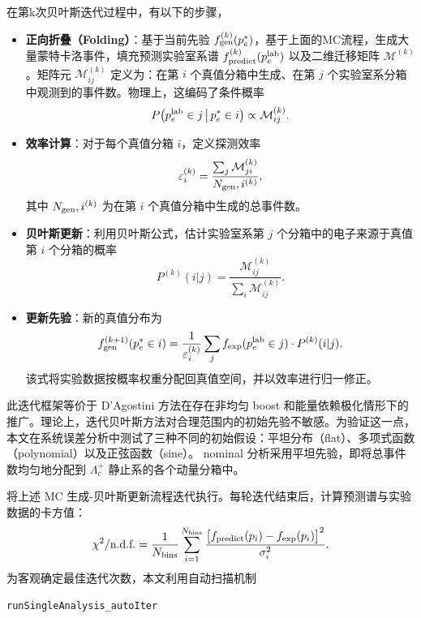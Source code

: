 在第k次贝叶斯迭代过程中，有以下的步骤，
\begin{itemize}
        \item \textbf{正向折叠（Folding）}：基于当前先验 $f_{\rm gen}^{(k)}(p_e^*)$，基于上面的MC流程，生成大量蒙特卡洛事件，填充预测实验室系谱 $f_{\rm predict}^{(k)}(p_e^{\rm lab})$ 以及二维迁移矩阵 $\mathcal{M}^{(k)}$。矩阵元 $\mathcal{M}^{(k)}_{ij}$ 定义为：在第 $i$ 个真值分箱中生成、在第 $j$ 个实验室系分箱中观测到的事件数。物理上，这编码了条件概率
    \begin{equation}\label{eq:migration_prob}
        P\bigl(p_e^{\rm lab} \in j \,\big|\, p_e^* \in i\bigr) \propto \mathcal{M}_{ij}^{(k)} .
    \end{equation}

    \item \textbf{效率计算}：对于每个真值分箱 $i$，定义探测效率
    \begin{equation}\label{eq:efficiency}
        \varepsilon_i^{(k)} = \frac{\sum_j \mathcal{M}_{ji}^{(k)}}{N_{\rm gen},i^{(k)}} ,
    \end{equation}
    其中 $N_{\rm gen},i^{(k)}$ 为在第 $i$ 个真值分箱中生成的总事件数。

    \item \textbf{贝叶斯更新}：利用贝叶斯公式，估计实验室系第 $j$ 个分箱中的电子来源于真值第 $i$ 个分箱的概率
    \begin{equation}\label{eq:bayes_prob}
        P^{(k)}(i|j) = \frac{\mathcal{M}_{ij}^{(k)}}{\sum_i \mathcal{M}_{ij}^{(k)}} .
    \end{equation}

    \item \textbf{更新先验}：新的真值分布为
    \begin{equation}\label{eq:update_formula}
        f_{\rm gen}^{(k+1)}(p_e^* \in i) = \frac{1}{\varepsilon_i^{(k)}} \sum_j f_{\rm exp}(p_e^{\rm lab} \in j) \cdot P^{(k)}(i|j) .
    \end{equation}
    该式将实验数据按概率权重分配回真值空间，并以效率进行归一修正。
\end{itemize}
此迭代框架等价于 D'Agostini 方法在存在非均匀 boost 和能量依赖极化情形下的推广。理论上，迭代贝叶斯方法对合理范围内的初始先验不敏感。为验证这一点，本文在系统误差分析中测试了三种不同的初始假设：平坦分布（flat）、多项式函数（polynomial）以及正弦函数（sine）。 nominal 分析采用平坦先验，即将总事件数均匀地分配到 $\Lambda_c^+$ 静止系的各个动量分箱中。

将上述 MC 生成-贝叶斯更新流程迭代执行。每轮迭代结束后，计算预测谱与实验数据的卡方值：
\begin{equation}
    \chi^2/\text{n.d.f.} = \frac{1}{N_{\rm bins}} \sum_{i=1}^{N_{\rm bins}} \frac{\bigl[f_{\rm predict}(p_i) - f_{\rm exp}(p_i)\bigr]^2}{\sigma_i^2} .
\end{equation}
为客观确定最佳迭代次数，本文利用自动扫描机制
\begin{center}
    \texttt{runSingleAnalysis\_autoIter}
\end{center}


